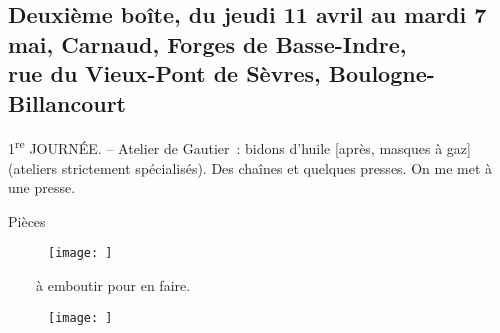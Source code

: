 \documentclass[french,twoside]{book} %
\begin{document}
\subsection[Deuxième boîte, du jeudi 11 avril au mardi 7 mai, Carnaud, Forges de Basse-Indre, rue du Vieux-Pont de Sèvres, Boulogne-Billancourt]{Deuxième boîte, du jeudi 11 avril au mardi 7 mai, Carnaud, Forges de Basse-Indre, \\
rue du Vieux-Pont de Sèvres, Boulogne-Billancourt}
\noindent \par
1\textsuperscript{re} JOURNÉE. – Atelier de Gautier : bidons d'huile [après, masques à gaz] (ateliers strictement spécialisés). Des chaînes et quelques presses. On me met à une presse.\par
Pièces    \begin{figure}[htbp]
\noindent\noindent\texttt{[image: ]}\end{figure}
    à emboutir pour en faire. \begin{figure}[htbp]
\noindent\noindent\texttt{[image: ]}\end{figure}
\par
\end{document}
